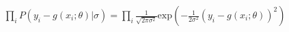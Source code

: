 \documentclass[10pt]{article}
\begin{document}
\begin{align*}\prod_i P\left( y_i - g\left(x_i;\theta\right) | \sigma\right) = 
\prod_i \frac{1}{\sqrt{2\pi\sigma^2}} \mathrm{exp}\left(-\frac{1}{2\sigma^2}\left(y_i - g\left(x_i;\theta\right)\right)^2\right)\end{align*}
\end{document}
